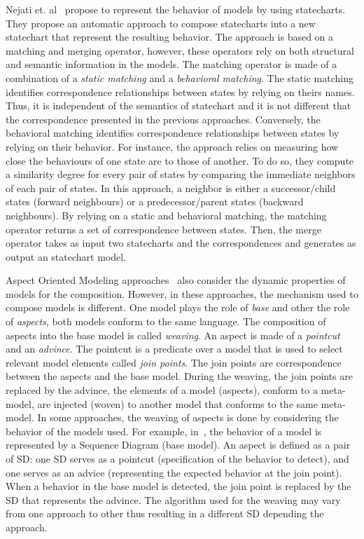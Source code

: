 Nejati et. al~\cite{compostatechartsbib} propose to represent the behavior of models by using statecharts. They propose an automatic approach to compose statecharts into a new statechart that represent the resulting behavior. The approach is based on a matching and merging operator, however, these operators rely on both structural and semantic information in the models. The matching operator is made of a combination of a \emph{static matching} and a \emph{behavioral matching}. The static matching identifies correspondence relationships between states by relying on theirs names. Thus, it is independent of the semantics of statechart and it is not different that the correspondence presented in the previous approaches. Conversely, the behavioral matching identifies correspondence relationships between states by relying on their behavior. For instance, the approach relies on measuring how close the behaviours of one state are to those of another. To do so, they compute a similarity degree for every pair of states by comparing the immediate neighbors of each pair of states. In this approach, a neighbor is either a successor/child states (forward neighbours) or a predecessor/parent states (backward neighbours). By relying on a static and behavioral matching, the matching operator returns a set of correspondence between states. Then, the merge operator takes as input two statecharts and the correspondences and generates as output an statechart model.
       
Aspect Oriented Modeling approaches~\cite{weavingbib} also consider the dynamic properties of models for the composition. However, in these approaches, the mechanism used to compose models is different. One model plays the role of \emph{base} and other the role of \emph{aspects}, both models conform to the same language. The composition of aspects into the base model is called \emph{weaving}. An aspect is made of a \emph{pointcut} and an \emph{advince}. The pointcut is a predicate over a model that is used to select relevant model elements called \emph{join points}. The join points are correspondence between the aspects and the base model. During the weaving, the join points are replaced by the advince, \ie the elements of a model (aspects), conform to a meta-model, are injected (woven) to another model that conforms to the same meta-model. In some approaches, the weaving of aspects is done by considering the behavior of the models used. For example, in~\cite{sequenceweavingbib,rambib,composdbib}, the behavior of a model is represented by a Sequence Diagram (base model). An aspect is defined as a pair of SD: one SD serves as a pointcut (specification of the behavior to detect), and one serves as an advice (representing the expected behavior at the join point). When a behavior in the base model is detected, the join point is replaced by the SD that represents the advince. The algorithm used for the weaving may vary from one approach to other thus resulting in a different SD depending the approach. 

